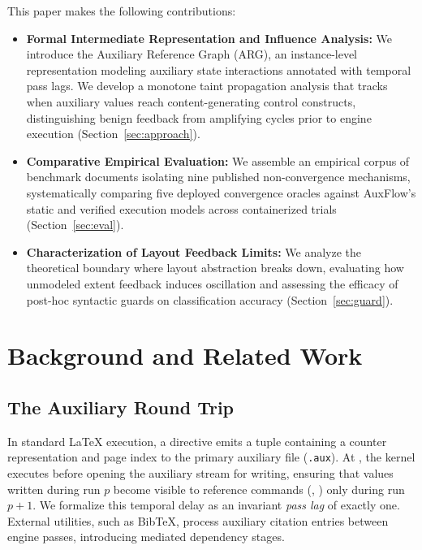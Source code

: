 \documentclass[conference]{IEEEtran}
\newcommand{\tex}[1]{\texttt{\detokenize{#1}}}
\begin{document}
This paper makes the following contributions:
\begin{itemize}
\item \textbf{Formal Intermediate Representation and Influence Analysis:} We introduce the Auxiliary Reference Graph (ARG), an instance-level representation modeling auxiliary state interactions annotated with temporal pass lags. We develop a monotone taint propagation analysis that tracks when auxiliary values reach content-generating control constructs, distinguishing benign feedback from amplifying cycles prior to engine execution (Section~\ref{sec:approach}).
\item \textbf{Comparative Empirical Evaluation:} We assemble an empirical corpus of \NDocs{} benchmark documents isolating nine published non-convergence mechanisms, systematically comparing five deployed convergence oracles against AuxFlow's static and verified execution models across \NRecords{} containerized trials (Section~\ref{sec:eval}).
\item \textbf{Characterization of Layout Feedback Limits:} We analyze the theoretical boundary where layout abstraction breaks down, evaluating how unmodeled extent feedback induces oscillation and assessing the efficacy of post-hoc syntactic guards on classification accuracy (Section~\ref{sec:guard}).
\end{itemize}

\section{Background and Related Work}
\label{sec:related}

\subsection{The Auxiliary Round Trip}

In standard \LaTeX{} execution, a \tex{\label} directive emits a \tex{\newlabel} tuple containing a counter representation and page index to the primary auxiliary file (\texttt{.aux}). At \tex{\begin{document}}, the kernel executes \tex{\@input{\jobname.aux}} before opening the auxiliary stream for writing, ensuring that values written during run $p$ become visible to reference commands (\tex{\ref}, \tex{\pageref}) only during run $p+1$. We formalize this temporal delay as an invariant \emph{pass lag} of exactly one. External utilities, such as BibTeX, process auxiliary citation entries between engine passes, introducing mediated dependency stages.
\end{document}
